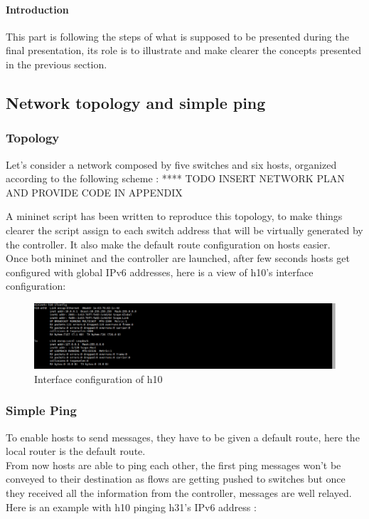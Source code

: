 \documentclass{article}
\begin{document}
\paragraph{Introduction}
This part is following the steps of what is supposed to be presented
during the final presentation, its role is to illustrate and make
clearer the concepts presented in the previous section.

\subsection{Network topology and simple ping}

\subsubsection{Topology}
Let's consider a network composed by five switches and six hosts,
organized according to the following scheme : 
**** TODO INSERT NETWORK PLAN AND PROVIDE CODE IN APPENDIX

A mininet script has been written to reproduce this topology, to make
things clearer the script assign to each switch address that will be
virtually generated by the controller. It also make the default route
configuration on hosts easier.\\
\newline
Once both mininet and the controller are launched, after few seconds
hosts get configured with global IPv6 addresses, here is a view of
h10's interface configuration:

\begin{figure}[h!]
  \centering
    \includegraphics[trim = 0mm 0mm 237mm 0mm,clip,scale=0.5]{reportPictures/h10_autoconfiguration.png}
  \caption{Interface configuration of h10}
\end{figure}


\subsubsection{Simple Ping}
To enable hosts to send messages, they have to be given a default
route, here the local router is the default route.\\
\newline
From now hosts are able to ping each other, the first ping messages
won't be conveyed to their destination as flows are getting pushed
to switches but once they received all the information from the
controller, messages are well relayed. Here is an example with h10
pinging h31's IPv6 address : 
\end{document}
